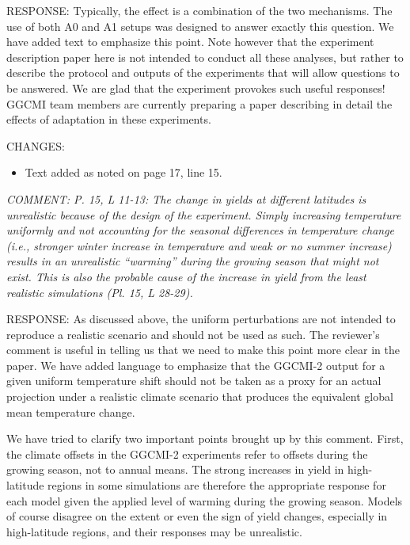 \documentclass[gmd, manuscript]{copernicus} %
\begin{document}
RESPONSE: Typically, the effect is a combination of the two mechanisms. The use of both A0 and A1 setups was designed to answer exactly this question. We have added text to emphasize this point. Note however that the experiment description paper here is not intended to conduct all these analyses, but rather to describe the protocol and outputs of the experiments that will allow questions to be answered. We are glad that the experiment provokes such useful responses! GGCMI team members are currently preparing a paper describing in detail the effects of adaptation in these experiments.
\smallskip

CHANGES:
\begin{itemize}
    \item Text added as noted on page 17, line 15.
\end{itemize}

\smallskip

\textcolor{dark-gray}{\textit{COMMENT: P. 15, L 11-13: The change in yields at different latitudes is unrealistic because of the design of the experiment. Simply increasing temperature uniformly and not accounting for the seasonal differences in temperature change (i.e., stronger winter increase in temperature and weak or no summer increase) results in an unrealistic “warming” during the growing season that might not exist. This is also the probable cause of the increase in yield from the least realistic simulations (Pl. 15, L 28-29).}}

RESPONSE: As discussed above, the uniform perturbations are not intended to reproduce a realistic scenario and should not be used as such. The reviewer’s comment is useful in telling us that we need to make this point more clear in the paper. We have added language to emphasize that the GGCMI-2 output for a given uniform temperature shift should not be taken as a proxy for an actual projection under a realistic climate scenario that produces the equivalent global mean temperature change. 

We have tried to clarify two important points brought up by this comment. First, the climate offsets in the GGCMI-2 experiments refer to offsets during the growing season, not to annual means. The strong increases in yield in high-latitude regions in some simulations are therefore the appropriate response for each model given the applied level of warming during the growing season. Models of course disagree on the extent or even the sign of yield changes, especially in high-latitude regions, and their responses may be unrealistic.
\end{document}
